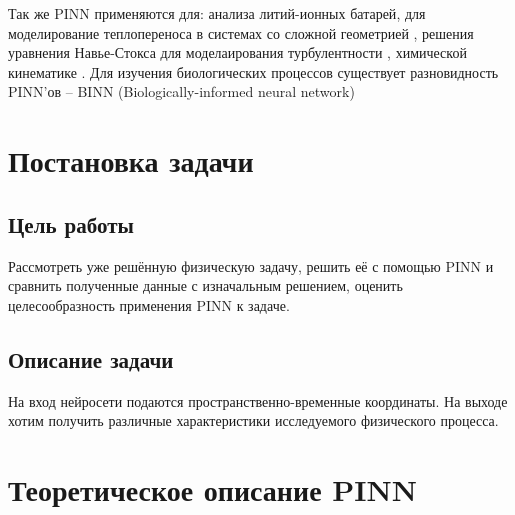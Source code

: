 \documentclass[a4paper,12pt]{article} %
\begin{document}
Так же PINN применяются для: анализа литий-ионных батарей\cite{bib:lbat:1,bib:lbat:2}, для моделирование теплопереноса в системах со сложной геометрией \cite{bib:heat:1,bib:heat:2}, решения уравнения Навье-Стокса для моделаирования турбулентности \cite{bib:navstock:1}, химической кинематике \cite{bib:chemkin:1,bib:chemkin:2}. Для изучения биологических процессов существует разновидность PINN'ов -- BINN (Biologically-informed neural network) \cite{bib:BINN:1}
\newpage

\section{Постановка задачи}

\subsection{Цель работы}

Рассмотреть уже решённую физическую задачу, решить её с помощью PINN и сравнить полученные данные с изначальным решением, оценить целесообразность применения PINN к задаче.

\subsection{Описание задачи}

На вход нейросети подаются пространственно-временные координаты. На выходе хотим получить различные характеристики исследуемого физического процесса.

\newpage

\section{Теоретическое описание PINN}
\end{document}
